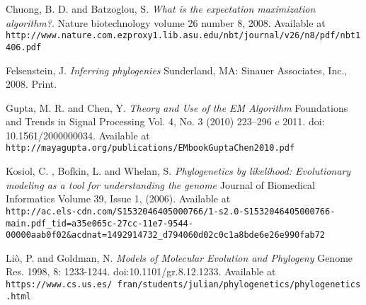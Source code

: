 \documentclass[12pt,twoside]{article}
\begin{document}
\begin{thebibliography}{9}
Chuong, B. D. and Batzoglou, S.
\textit{What is the expectation maximization algorithm?}. 
Nature biotechnology volume 26 number 8, 2008. Available at \\\texttt{http://www.nature.com.ezproxy1.lib.asu.edu/nbt/journal/v26/n8/pdf/nbt1406.pdf}
 
Felsenstein, J. 
\textit{Inferring phylogenies} 
Sunderland, MA: Sinauer Associates, Inc., 2008. Print.
 
Gupta, M. R. and Chen, Y.
\textit{Theory and Use of the EM Algorithm}
Foundations and Trends in Signal Processing Vol. 4, No. 3 (2010) 223–296 c 2011. doi: 10.1561/2000000034. Available at 
\\\texttt{http://mayagupta.org/publications/EMbookGuptaChen2010.pdf}

Kosiol, C. , Bofkin, L. and Whelan, S.
\textit{Phylogenetics by likelihood: Evolutionary modeling as a tool for understanding the genome} 
Journal of Biomedical Informatics Volume 39, Issue 1, (2006). Available at 
\\\texttt{http://ac.els-cdn.com/S1532046405000766/1-s2.0-S1532046405000766-main.pdf\_tid=a35e065c-27cc-11e7-9544-00000aab0f02\&acdnat=1492914732\_d794060d02c0c1a8bde6e26e990fab72}

Liò, P. and Goldman, N.
\textit{Models of Molecular Evolution and Phylogeny}
Genome Res. 1998, 8: 1233-1244. doi:10.1101/gr.8.12.1233. Available at 
\texttt{https://www.cs.us.es/~fran/students/julian/phylogenetics/phylogenetics.html}
\end{thebibliography}
\end{document}
